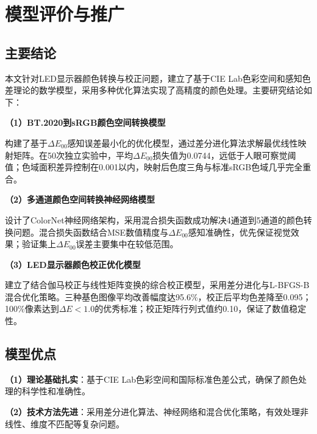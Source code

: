 \chapter[\hspace{0pt}模型评价与推广]{{\heiti{}\hspace{0pt}模型评价与推广}}\label{chapter4: 模型评价与推广}
\removelofgap
\removelotgap

\section[\hspace{-2pt}主要结论]{{\heiti{} \hspace{-8pt}主要结论}}\label{section5: 主要结论}

本文针对LED显示器颜色转换与校正问题，建立了基于CIE Lab色彩空间和感知色差理论的数学模型，采用多种优化算法实现了高精度的颜色处理。主要研究结论如下：

\noindent\textbf{（1）BT.2020到sRGB颜色空间转换模型}

构建了基于$\Delta E_{00}$感知误差最小化的优化模型，通过差分进化算法求解最优线性映射矩阵。在50次独立实验中，平均$\Delta E_{00}$损失值为0.0744，远低于人眼可察觉阈值；色域面积差异控制在0.001以内，映射后色度三角与标准sRGB色域几乎完全重合。

\noindent\textbf{（2）多通道颜色空间转换神经网络模型}

设计了ColorNet神经网络架构，采用混合损失函数成功解决4通道到5通道的颜色转换问题。混合损失函数结合MSE数值精度与$\Delta E_{00}$感知准确性，优先保证视觉效果；验证集上$\Delta E_{00}$误差主要集中在较低范围。

\noindent\textbf{（3）LED显示器颜色校正优化模型}

建立了结合伽马校正与线性矩阵变换的综合校正模型，采用差分进化与L-BFGS-B混合优化策略。三种基色图像平均改善幅度达95.6\%，校正后平均色差降至0.095；100\%像素达到$\Delta E<1.0$的优秀标准；校正矩阵行列式值约0.10，保证了数值稳定性。

\section[\hspace{-2pt}模型优点]{{\heiti{} \hspace{-8pt}模型优点}}\label{section5: 模型优点}

\noindent\textbf{（1）理论基础扎实}：基于CIE Lab色彩空间和国际标准色差公式，确保了颜色处理的科学性和准确性。

\noindent\textbf{（2）技术方法先进}：采用差分进化算法、神经网络和混合优化策略，有效处理非线性、维度不匹配等复杂问题。

